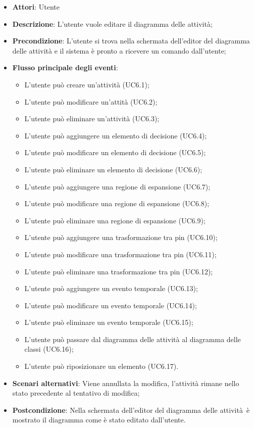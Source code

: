 \documentclass[../AnalisiDeiRequisiti.tex]{subfiles}
\begin{document}
			\begin{itemize}
				\item \textbf{Attori}: Utente
				\item \textbf{Descrizione}: L'utente vuole editare il diagramma delle attività;
				\item \textbf{Precondizione}: L'utente si trova nella schermata dell'editor del diagramma delle attività e il sistema è pronto a ricevere un comando dall'utente;
				\item \textbf{Flusso principale degli eventi}: \begin{itemize}
					\item L'utente può creare un'attività (UC6.1);
					\item L'utente può modificare un'attità (UC6.2);
					\item L'utente può eliminare un'attività (UC6.3);
					\item L'utente può aggiungere un elemento di decisione (UC6.4);
					\item L'utente può modificare un elemento di decisione (UC6.5);
					\item L'utente può eliminare un elemento di decisione (UC6.6);
					\item L'utente può aggiungere una regione di espansione (UC6.7);
					\item L'utente può modificare una regione di espansione (UC6.8);
					\item L'utente può eliminare una regione di espansione (UC6.9);
					\item L'utente può aggiungere una trasformazione tra pin (UC6.10);
					\item L'utente può modificare una trasformazione tra pin (UC6.11);
					\item L'utente può eliminare una trasformazione tra pin (UC6.12);
					\item L'utente può aggiungere un evento temporale (UC6.13);
					\item L'utente può modificare un evento temporale (UC6.14);
					\item L'utente può eliminare un evento temporale (UC6.15);
					\item L'utente può passare dal diagramma delle attività al diagramma delle classi (UC6.16);
					\item L'utente può riposizionare un elemento (UC6.17).
				\end{itemize}
					\item \textbf{Scenari alternativi}: Viene annullata la modifica, l'attività rimane nello stato precedente al tentativo di modifica;
					\item \textbf{Postcondizione}: Nella schermata dell'editor del diagramma delle attività è mostrato il diagramma come è stato editato dall'utente.
				\end{itemize}
\end{document}
